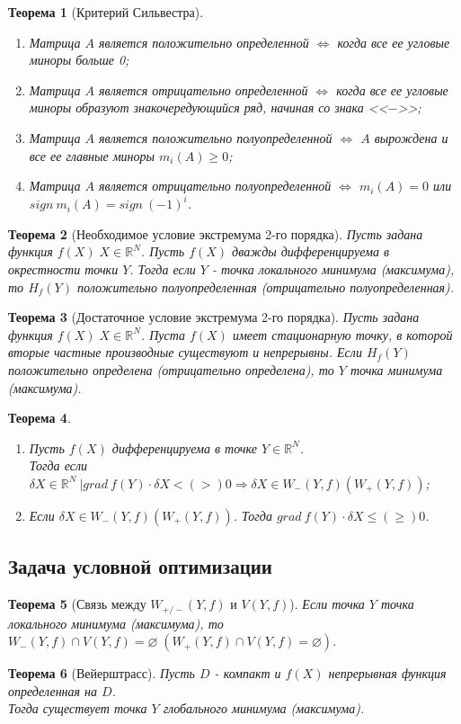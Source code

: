 \documentclass[12pt]{article}
\newtheorem{theorem}{Теорема}[subsection]
\theoremstyle{definition}
\theoremstyle{remark}
\begin{document}
\begin{theorem}[Критерий Сильвестра]
  \item
\begin{enumerate}
  \item Матрица $A$ является положительно определенной $\iff$ когда все ее угловые миноры больше 0;
  \item Матрица $A$ является отрицательно определенной $\iff$ когда все ее угловые миноры образуют знакочередующийся ряд, начиная со знака <<$-$>>;
  \item Матрица $A$ является положительно полуопределенной $\iff$ $A$ вырождена и все ее главные миноры $m_i(A)\geqslant 0$;
  \item Матрица $A$ является отрицательно полуопределенной $\iff$ $m_i(A)=0$ или $sign\:m_i(A)=sign\:(-1)^i$.
\end{enumerate}
\end{theorem}
\begin{theorem}[Необходимое условие экстремума 2-го порядка]
Пусть задана функция $f(X)\;X\in\mathbb{R}^N$. Пусть  $f(X)$ дважды дифференцируема в окрестности точки $Y$. Тогда если $Y$ - точка локального минимума (максимума), то $H_f(Y)$ положительно полуопределенная (отрицательно полуопределенная).
\end{theorem}
\begin{theorem}[Достаточное условие экстремума 2-го порядка]
Пусть задана функция $f(X)\;X\in\mathbb{R}^N$. Пуста $f(X)$ имеет стационарную точку, в которой вторые частные производные существуют и непрерывны. Если $H_f(Y)$ положительно определена (отрицательно определена), то $Y$ точка минимума (максимума).
\end{theorem}
\begin{theorem}
  \item
  \begin{enumerate}
    \item Пусть $f(X)$ дифференцируема в точке $Y\in\mathbb{R}^N$. \\Тогда если $\delta X\in\mathbb{R}^N \:\big| grad\:f(Y)\cdot \delta X <(>)0
  \Rightarrow \delta X \in W_-(Y,f)(W_+(Y,f))$;
  \item Если $\delta X \in W_-(Y,f)(W_+(Y,f))$. Тогда  $grad\:f(Y)\cdot \delta X \leqslant(\geqslant)0$.
  \end{enumerate}
\end{theorem}
\subsection{Задача условной оптимизации}
\begin{theorem}[Связь между $W_{+/-}(Y,f)$ и $V(Y,f)$]
Если точка $Y$ точка локального минимума (максимума), то $W_-(Y,f)\cap V(Y,f)= \varnothing \;(W_+(Y,f)\cap V(Y,f)= \varnothing) $.
\end{theorem}
\begin{theorem}[Вейерштрасс]
  Пусть $D$ - компакт и $f(X)$ непрерывная функция определенная на $D$.\\
  Тогда существует точка $Y$ глобального минимума (максимума).
\end{theorem}
\end{document}
